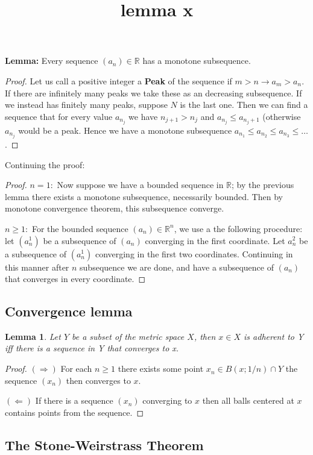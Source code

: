 \documentclass[titlepage]{article}
\newtheorem{lem}[thm]{Lemma}
\begin{document}
\textbf{Lemma:}
Every sequence $(a_n) \in \mathbb{R}$ has a monotone subsequence.
\begin{proof}

Let us call a positive integer a \textbf{Peak} of the sequence if $m>n \rightarrow a_m>a_n$. If there are infinitely many peaks we take these as an decreasing subsequence.
If we instead has finitely many peaks, suppose $N$ is the last one. Then we can find a sequence that for every value $a_{n_j}$ we have 
$n_{j+1} > n_j$ and $a_{n_j} \leq a_{n_j+1}$ (otherwise $a_{n_j}$ would be a peak. Hence we have a monotone subsequence $a_{n_1} \leq a_{n_2} \leq a_{n_3} \leq \ldots $.
\end{proof}
Continuing the proof:
\begin{proof}
$n= 1:$ Now suppose we have a bounded sequence in $\mathbb{R}$; by the previous lemma there exists a monotone subsequence, necessarily bounded. Then by monotone convergence theorem, this subsequence converge.

$n \geq 1: $ For the bounded sequence $(a_n) \in \mathbb{R}^n$, we use a the following procedure:
let $(a_n^1)$ be a subsequence of $(a_n)$  converging in the first coordinate. Let $a_n^2$ be a subsequence of  $(a_n^1)$ converging in the first two coordinates. Continuing in this manner after $n$ subsequence we are done, and have a subsequence of $(a_n)$ that converges in every coordinate.
\end{proof}


\subsection{Convergence lemma}
\begin{lem}
Let $Y$ be a subset of the metric space $X$, then $x\in X$ is adherent to Y iff there is a sequence in Y that converges to x.
\end{lem}

\begin{proof}
\title{lemma x}
$(\Rightarrow)$ For each $n\geq 1$ there exists some point $x_n \in B(x;1/n)\cap Y$ the sequence $(x_n)$ then converges to $x$.

$(\Leftarrow)$  If there is a sequence $(x_n)$ converging to $x$ then all balls centered at $x$ contains points from the sequence.
\end{proof}
\subsection{The Stone-Weirstrass Theorem}
\end{document}
